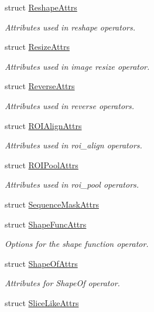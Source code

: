 \begin{DoxyCompactItemize}
struct \hyperlink{structtvm_1_1relay_1_1ReshapeAttrs}{Reshape\+Attrs}
\begin{DoxyCompactList}\small\item\em Attributes used in reshape operators. \end{DoxyCompactList}\item 
struct \hyperlink{structtvm_1_1relay_1_1ResizeAttrs}{Resize\+Attrs}
\begin{DoxyCompactList}\small\item\em Attributes used in image resize operator. \end{DoxyCompactList}\item 
struct \hyperlink{structtvm_1_1relay_1_1ReverseAttrs}{Reverse\+Attrs}
\begin{DoxyCompactList}\small\item\em Attributes used in reverse operators. \end{DoxyCompactList}\item 
struct \hyperlink{structtvm_1_1relay_1_1ROIAlignAttrs}{R\+O\+I\+Align\+Attrs}
\begin{DoxyCompactList}\small\item\em Attributes used in roi\+\_\+align operators. \end{DoxyCompactList}\item 
struct \hyperlink{structtvm_1_1relay_1_1ROIPoolAttrs}{R\+O\+I\+Pool\+Attrs}
\begin{DoxyCompactList}\small\item\em Attributes used in roi\+\_\+pool operators. \end{DoxyCompactList}\item 
struct \hyperlink{structtvm_1_1relay_1_1SequenceMaskAttrs}{Sequence\+Mask\+Attrs}
\item 
struct \hyperlink{structtvm_1_1relay_1_1ShapeFuncAttrs}{Shape\+Func\+Attrs}
\begin{DoxyCompactList}\small\item\em Options for the shape function operator. \end{DoxyCompactList}\item 
struct \hyperlink{structtvm_1_1relay_1_1ShapeOfAttrs}{Shape\+Of\+Attrs}
\begin{DoxyCompactList}\small\item\em Attributes for Shape\+Of operator. \end{DoxyCompactList}\item 
struct \hyperlink{structtvm_1_1relay_1_1SliceLikeAttrs}{Slice\+Like\+Attrs}
\item 

\end{DoxyCompactItemize}
